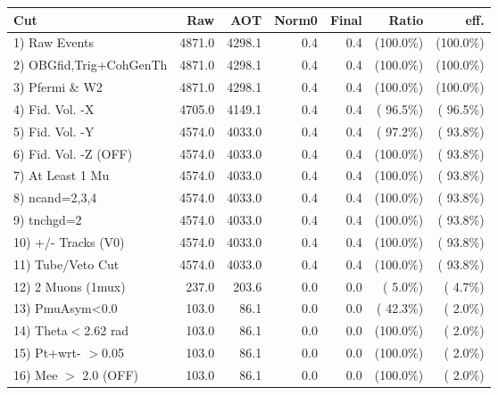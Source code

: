  \begin{table}[h!]\centering
 \begin{tabular}{||l||r|r|r|r|r|r||}
 \hline
 \hline
 Cut & Raw & AOT & Norm0 & Final & Ratio & eff.       \\
 \hline
  1) Raw Events           &       4871.0 &       4298.1 &          0.4 &          0.4 & (100.0\%) & (100.0\%) \\
  2) OBGfid,Trig+CohGenTh &       4871.0 &       4298.1 &          0.4 &          0.4 & (100.0\%) & (100.0\%) \\
  3) Pfermi \& W2         &       4871.0 &       4298.1 &          0.4 &          0.4 & (100.0\%) & (100.0\%) \\
  4) Fid. Vol. -X         &       4705.0 &       4149.1 &          0.4 &          0.4 & ( 96.5\%) & ( 96.5\%) \\
  5) Fid. Vol. -Y         &       4574.0 &       4033.0 &          0.4 &          0.4 & ( 97.2\%) & ( 93.8\%) \\
  6) Fid. Vol. -Z (OFF)   &       4574.0 &       4033.0 &          0.4 &          0.4 & (100.0\%) & ( 93.8\%) \\
  7) At Least 1 Mu        &       4574.0 &       4033.0 &          0.4 &          0.4 & (100.0\%) & ( 93.8\%) \\
  8) ncand=2,3,4          &       4574.0 &       4033.0 &          0.4 &          0.4 & (100.0\%) & ( 93.8\%) \\
  9) tnchgd=2             &       4574.0 &       4033.0 &          0.4 &          0.4 & (100.0\%) & ( 93.8\%) \\
 10) +/- Tracks (V0)      &       4574.0 &       4033.0 &          0.4 &          0.4 & (100.0\%) & ( 93.8\%) \\
 11) Tube/Veto Cut        &       4574.0 &       4033.0 &          0.4 &          0.4 & (100.0\%) & ( 93.8\%) \\
 12) 2 Muons (1mux)       &        237.0 &        203.6 &          0.0 &          0.0 & (  5.0\%) & (  4.7\%) \\
 13) PmuAsym<0.0          &        103.0 &         86.1 &          0.0 &          0.0 & ( 42.3\%) & (  2.0\%) \\
 14) Theta$<$2.62 rad     &        103.0 &         86.1 &          0.0 &          0.0 & (100.0\%) & (  2.0\%) \\
 15) Pt+wrt- $>$0.05      &        103.0 &         86.1 &          0.0 &          0.0 & (100.0\%) & (  2.0\%) \\
 16) Mee $>$ 2.0  (OFF)   &        103.0 &         86.1 &          0.0 &          0.0 & (100.0\%) & (  2.0\%) \\

\end{tabular}
\end{table}
